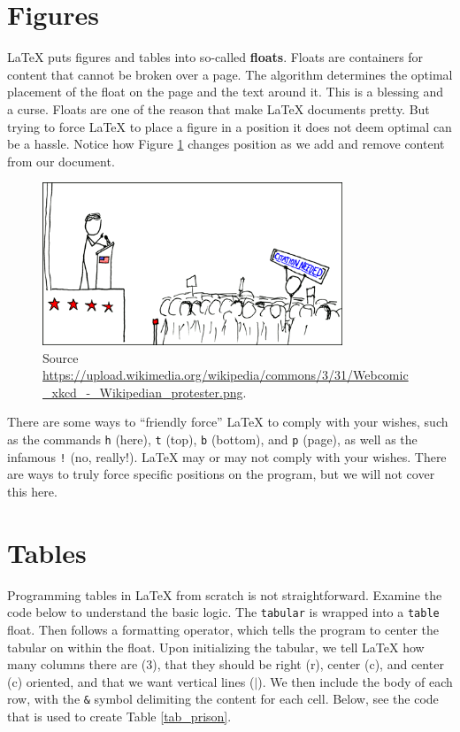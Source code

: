 \documentclass[11pt,letterpaper,oneside]{article} %
\begin{document}
\section{Figures}
{\LaTeX} puts figures and tables into so-called \textbf{floats}. Floats are containers for content that cannot be broken over a page. The algorithm determines the optimal placement of the float on the page and the text around it. This is a blessing and a curse. Floats are one of the reason that make {\LaTeX} documents pretty. But trying to force {\LaTeX} to place a figure in a position it does not deem optimal can be a hassle. Notice how Figure \ref{graph1} changes position as we add and remove content from our document.

\begin{figure}[!h] 
\begin{center}
\includegraphics[width = 0.8\textwidth]{const.png}
\caption{Source \url{https://upload.wikimedia.org/wikipedia/commons/3/31/Webcomic_xkcd_-_Wikipedian_protester.png}.}
\label{graph1}
\end{center}
\end{figure}


There are some ways to ``friendly force'' %
{\LaTeX} to comply with your wishes, such as the commands \texttt{h} (here),  \texttt{t} (top),  \texttt{b} (bottom), and  \texttt{p} (page), as well as the infamous  \texttt{!} (no, really!). {\LaTeX} may or may not comply with your wishes. There are ways to truly force specific positions on the program, but we will not cover this here. 


\section{Tables}
Programming tables in {\LaTeX} from scratch is not straightforward. Examine the code below to understand the basic logic. The \texttt{tabular} is wrapped into a \texttt{table} float. Then follows a formatting operator, which tells the program to center the tabular on within the float. Upon initializing the tabular, we tell {\LaTeX} how many columns there are (3), that they should be right (r), center (c), and center (c) oriented, and that we want vertical lines ($|$). We then include the body of each row, with the \texttt{\&} symbol delimiting the content for each cell. Below, see the code that is used to create Table \ref{tab_prison}.
\end{document}
